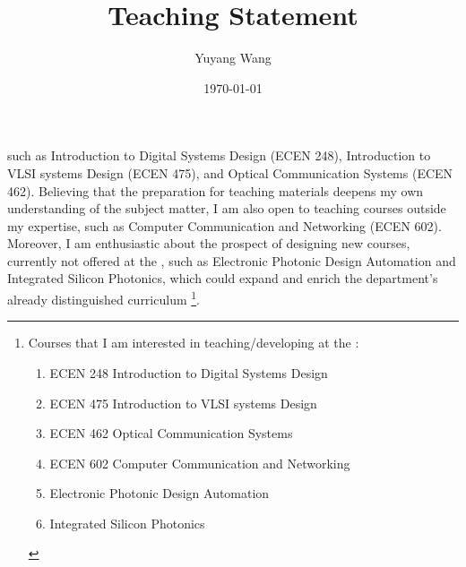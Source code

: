 



\title{Teaching Statement}

\def\courseOneName{Introduction to Digital Systems Design}
\def\courseOneNumber{ECEN 248}
\def\courseTwoName{Introduction to VLSI systems Design}
\def\courseTwoNumber{ECEN 475}
\def\courseThreeName{Optical Communication Systems}
\def\courseThreeNumber{ECEN 462}
\def\courseFourName{Computer Communication and Networking}
\def\courseFourNumber{ECEN 602}
\def\courseSixName{Electronic Photonic Design Automation}
\def\courseSevenName{Integrated Silicon Photonics}

\def\rsCustom{%
such as \courseOneName{} (\courseOneNumber{}), \courseTwoName{} (\courseTwoNumber{}), and \courseThreeName{} (\courseThreeNumber{}). Believing that the preparation for teaching materials deepens my own understanding of the subject matter, I am also open to teaching courses outside my expertise, such as \courseFourName{} (\courseFourNumber{}). Moreover, I am enthusiastic about the prospect of designing new courses, currently not offered at the \appSchool{}, such as \courseSixName{} and \courseSevenName{}, which could expand and enrich the department's already distinguished curriculum%
\footnote{%
Courses that I am interested in teaching/developing at the \appDept{}:
\begin{enumerate}
    \item \courseOneNumber{} \courseOneName{}
    \item \courseTwoNumber{} \courseTwoName{}
    \item \courseThreeNumber{} \courseThreeName{}
    \item \courseFourNumber{} \courseFourName{}
    \item \courseSixName{}
    \item \courseSevenName{}
\end{enumerate}
}.
}

\author{Yuyang Wang}
\date{\today}
\makeatletter
\fancyfoot[L]{\scshape \MakeLowercase{\@author}}
\fancyfoot[R]{{\scshape \MakeLowercase{\@title}}\quad{\fontsize{16}{20}\selectfont\sfrac{\thepage}{\pageref*{LastPage}}}\hspace{0.25in}}
\makeatother



\maketitle%


\rsCustom{}


\footnotesize


